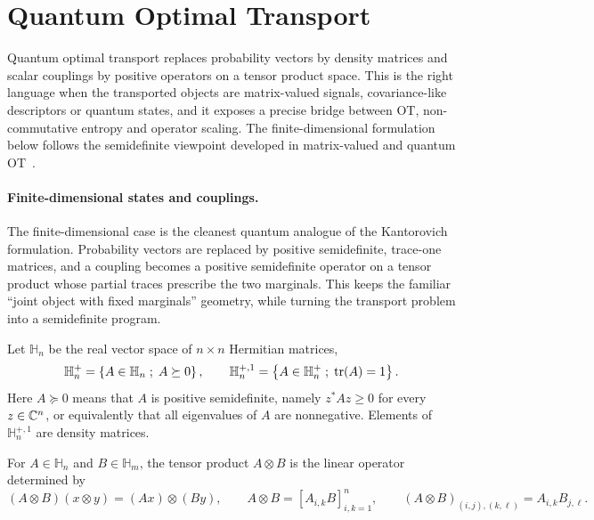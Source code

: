 \section{Quantum Optimal Transport}
\label{sec-quantum-ot}

Quantum optimal transport replaces probability vectors by density matrices and scalar couplings by positive operators on a tensor product space. This is the right language when the transported objects are matrix-valued signals, covariance-like descriptors or quantum states, and it exposes a precise bridge between OT, non-commutative entropy and operator scaling. The finite-dimensional formulation below follows the semidefinite viewpoint developed in matrix-valued and quantum OT~\cite{Ning2014metrics,Chen2016,ChenGangbo17,2016-peyre-qot,caglioti2019quantum,chakrabarti2019quantum}.

\paragraph{Finite-dimensional states and couplings.}

The finite-dimensional case is the cleanest quantum analogue of the Kantorovich formulation. Probability vectors are replaced by positive semidefinite, trace-one matrices, and a coupling becomes a positive semidefinite operator on a tensor product whose partial traces prescribe the two marginals. This keeps the familiar ``joint object with fixed marginals'' geometry, while turning the transport problem into a semidefinite program.

\begin{defn}\label{def-hermitian-density-matrices}
	Let $\mathbb H_n$ be the real vector space of $n\times n$ Hermitian matrices,
	\[
		\mathbb H_n^+
		=
		\left\{ A\in\mathbb H_n \;;\; A\succeq0 \right\},
		\qquad
		\mathbb H_n^{+,1}
		=
		\left\{ A\in\mathbb H_n^+ \;;\; \operatorname{tr}(A)=1 \right\}.
	\]
	Here $A\succeq0$ means that $A$ is positive semidefinite, namely $z^*Az\geq0$ for every $z\in\mathbb{C}^n$, or equivalently that all eigenvalues of $A$ are nonnegative.
	Elements of $\mathbb H_n^{+,1}$ are density matrices.
\end{defn}

For $A\in\mathbb H_n$ and $B\in\mathbb H_m$, the tensor product $A\otimes B$ is the linear operator determined by
\begin{equation}\label{eq-qot-tensor-product}
	(A\otimes B)(x\otimes y)=(Ax)\otimes(By),
	\qquad
	A\otimes B=[A_{i,k}B]_{i,k=1}^n,
	\qquad
	(A\otimes B)_{(i,j),(k,\ell)}=A_{i,k}B_{j,\ell}.
\end{equation}

